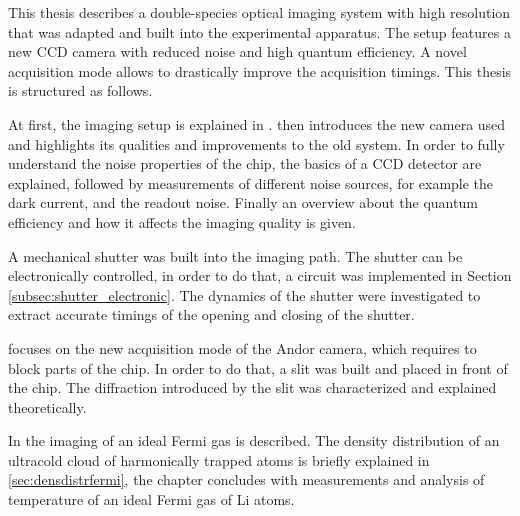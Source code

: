 This thesis describes a double-species optical imaging system with high resolution that was adapted and built into the experimental apparatus. The setup features a new CCD camera with reduced noise and high quantum efficiency. A novel acquisition mode allows to drastically improve the acquisition timings. This thesis is structured as follows.

At first, the imaging setup is explained in .  then introduces the new camera used and highlights its qualities and improvements to the old system. In order to fully understand the noise properties of the chip, the basics of a CCD detector are explained, followed by measurements of different noise sources, for example the dark current, and the readout noise.
Finally an overview about the quantum efficiency and how it affects the imaging quality is given.

A mechanical shutter was built into the imaging path. The shutter can be electronically controlled, in order to do that, a circuit was implemented in Section \ref{subsec:shutter_electronic}. The dynamics of the shutter were investigated to extract accurate timings of the opening and closing of the shutter.

 focuses on the new acquisition mode of the Andor camera, which requires to block parts of the chip. In order to do that, a slit was built and placed in front of the chip. The diffraction introduced by the slit was characterized and explained theoretically.

In  the imaging of an ideal Fermi gas is described. The density distribution of an ultracold cloud of harmonically trapped atoms is briefly explained in \ref{sec:densdistrfermi}, the chapter concludes with measurements and analysis of temperature of an ideal Fermi gas of Li atoms.